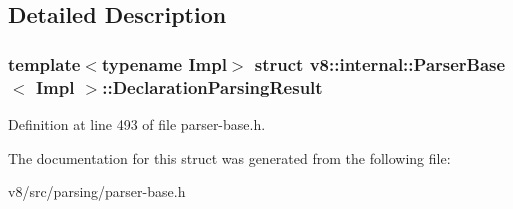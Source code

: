 \subsection{Detailed Description}
\subsubsection*{template$<$typename Impl$>$\newline
struct v8\+::internal\+::\+Parser\+Base$<$ Impl $>$\+::\+Declaration\+Parsing\+Result}



Definition at line 493 of file parser-\/base.\+h.



The documentation for this struct was generated from the following file\+:\begin{DoxyCompactItemize}
\item 
v8/src/parsing/parser-\/base.\+h\end{DoxyCompactItemize}
